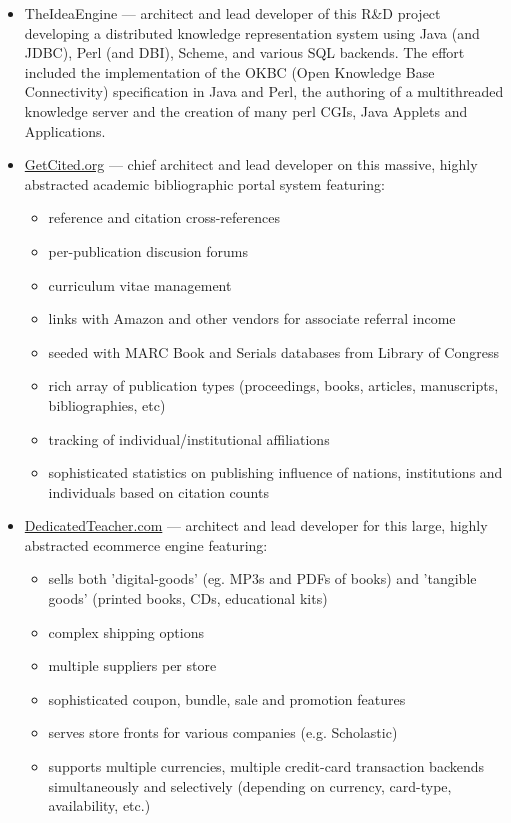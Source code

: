 \documentclass[line,margin]{res}
\begin{document}
\begin{resume}
\begin{position}
\begin{itemize}

\item TheIdeaEngine --- architect and lead developer of this R\&D project
  developing a distributed knowledge representation system using
  Java (and JDBC), Perl (and DBI), Scheme, and various SQL backends.
  The effort included the
  implementation of the OKBC (Open Knowledge Base Connectivity)
  specification in Java and Perl,
  the authoring of a multithreaded knowledge server
  and the creation of many perl CGIs, Java Applets and Applications.

\item \href{https://web.archive.org/web/20140517102110/http://getcited.org/}{GetCited.org}
  --- chief architect and lead developer on this massive, highly abstracted
      academic bibliographic portal system featuring:
  \begin{itemize}
    \item reference and citation cross-references
    \item per-publication discusion forums
    \item curriculum vitae management
    \item links with Amazon and other vendors for associate
    referral income
    \item seeded with MARC Book and Serials databases from Library of Congress
    \item rich array of publication types (proceedings, books, articles,
       manuscripts, bibliographies, etc)
    \item tracking of individual/institutional affiliations
    \item sophisticated statistics on publishing influence of
       nations, institutions and individuals based on citation counts
  \end{itemize}

\item \href{http://www.dedicatedteacher.com/}{DedicatedTeacher.com}
   --- architect and lead developer
  for this large, highly abstracted ecommerce engine featuring:
    \begin{itemize}
      \item sells both 'digital-goods' (eg. MP3s and PDFs of books)
      and 'tangible goods' (printed books, CDs, educational kits)
      \item complex shipping options
      \item multiple suppliers per store
      \item sophisticated coupon, bundle, sale and promotion features
      \item serves store fronts for various companies
      (e.g. Scholastic)
      \item supports multiple currencies, multiple credit-card
      transaction backends simultaneously and selectively
      (depending on currency, card-type, availability, etc.)
    \end{itemize}


\end{itemize}
\end{position}
\end{resume}
\end{document}
